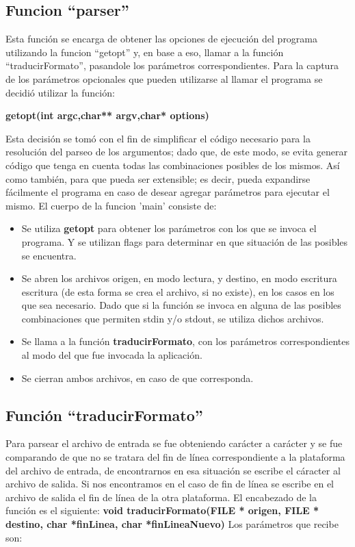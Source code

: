 \documentclass[a4paper,10pt]{article}
\begin{document}
  \subsection{Funcion ``parser''}
  Esta funci\'on se encarga de obtener las opciones de ejecuci\'on del programa utilizando la funcion ``getopt'' y, en base
  a eso, llamar a la funci\'on ``traducirFormato'', pasandole los par\'ametros correspondientes.
  \newline
  Para la captura de los par\'ametros opcionales que pueden utilizarse al 
  llamar el programa se decidi\'o utilizar la funci\'on:
  \begin{center}
    {\bf getopt(int argc,char** argv,char* options)}
  \end{center}
  Esta decisi\'on se tom\'o con el fin de simplificar el c\'odigo necesario para la resoluci\'on del parseo de los
  argumentos; dado que, de este modo, se evita generar c\'odigo que tenga
  en cuenta todas las combinaciones posibles de los mismos. As\'i como
  tambi\'en, para que pueda ser extensible; es decir, pueda expandirse
  f\'acilmente el programa en caso de desear agregar par\'ametros para
  ejecutar el mismo.
  El cuerpo de la funcion 'main' consiste de:
  \begin{itemize}
  \item Se utiliza {\bf getopt} para obtener los par\'ametros con los que se invoca el programa. Y se 
    utilizan flags para determinar en que situaci\'on de las posibles se encuentra.
  \item Se abren los archivos origen, en modo lectura, y destino, en modo escritura escritura (de esta
    forma se crea el archivo, si no existe), en los casos en los que sea necesario. Dado que si la funci\'on
    se invoca en alguna de las posibles combinaciones que permiten stdin y/o stdout, se utiliza dichos 
    archivos.
  \item Se llama a la funci\'on {\bf traducirFormato}, con los par\'ametros 
    correspondientes al modo del que fue invocada la aplicaci\'on.
  \item Se cierran ambos archivos, en caso de que corresponda.
  \end{itemize}


  \subsection{Funci\'on ``traducirFormato''}
  Para parsear el archivo de entrada se fue obteniendo car\'acter a car\'acter y
  se fue comparando de que no se tratara del fin de l\'inea
  correspondiente a la plataforma del archivo de entrada, de
  encontrarnos en esa situaci\'on se escribe el c\'aracter al archivo de
  salida. Si nos encontramos en el caso de fin de l\'inea se escribe en el
  archivo de salida el fin de l\'inea de la otra plataforma. 
  El encabezado de la funci\'on es el siguiente:
  \newline
  {\bf void traducirFormato(FILE * origen, FILE * destino, char *finLinea, char *finLineaNuevo)}
  \newline
  Los par\'ametros que recibe son:
\end{document}
